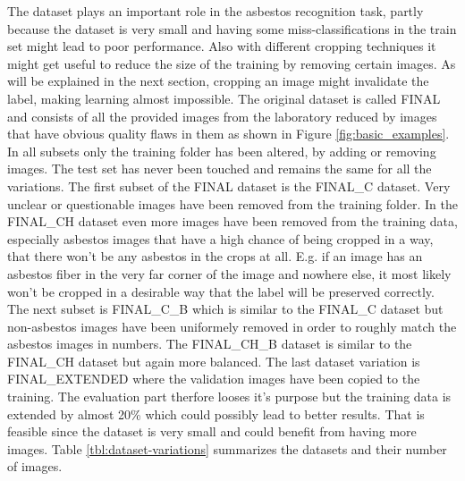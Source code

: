The dataset plays an important role in the asbestos recognition task, partly because the dataset is very small and having some miss-classifications in the train set might lead to poor performance. Also with different cropping techniques it might get useful to reduce the size of the training by removing certain images. As will be explained in the next section, cropping an image might invalidate the label, making learning almost impossible. The original dataset is called FINAL and consists of all the provided images from the laboratory reduced by images that have obvious quality flaws in them as shown in Figure  \ref{fig:basic_examples}. In all subsets only the training folder has been altered, by adding or removing images. The test set has never been touched and remains the same for all the variations. The first subset of the FINAL dataset is the FINAL\_C dataset. Very unclear or questionable images have been removed from the training folder. In the FINAL\_CH dataset even more images have been removed from the training data, especially asbestos images that have a high chance of being cropped in a way, that there won't be any asbestos in the crops at all. E.g. if an image has an asbestos fiber in the very far corner of the image and nowhere else, it most likely won't be cropped in a desirable way that the label will be preserved correctly. The next subset is FINAL\_C\_B which is similar to the FINAL\_C dataset but non-asbestos images have been uniformely removed in order to roughly match the asbestos images in numbers. The FINAL\_CH\_B dataset is similar to the FINAL\_CH dataset but again more balanced. The last dataset variation is FINAL\_EXTENDED where the validation images have been copied to the training. The evaluation part therfore looses it's purpose but the training data is extended by almost 20\% which could possibly lead to better results. That is feasible since the dataset is very small and could benefit from having more images. Table \ref{tbl:dataset-variations} summarizes the datasets and their number of images.

